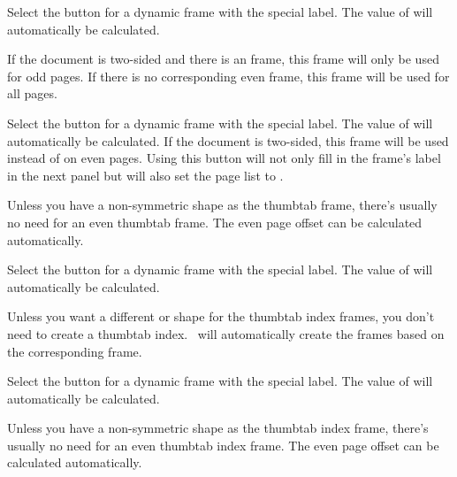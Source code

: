 Select the  button for a dynamic frame
with the special  label. The value of 
will automatically be calculated.

If the document is two-sided and there is an
 frame, this frame will only be used for
odd pages. If there is no corresponding even frame, this frame will
be used for all pages.

Select the  button for a dynamic frame
with the special  label.
The value of  will automatically be calculated.  If the
document is two-sided, this frame will be used instead of
 on even pages. Using this button will not
only fill in the frame's label in the next panel but will also set
the page list to .

\begin{information}
Unless you have a non-symmetric shape as the thumbtab frame, there's
usually no need for an even thumbtab frame. The even page offset can
be calculated automatically.
\end{information}

Select the  button for a dynamic frame
with the special 
label. The value of  will automatically be calculated.

\begin{information}
Unless you want a different  or shape for the
thumbtab index frames, you don't need to create a thumbtab index.
\FlowframTk\ will automatically create the  frames
based on the corresponding  frame.
\end{information}

Select the  button for a dynamic frame
with the special 
label. The value of  will automatically be calculated.

\begin{information}
Unless you have a non-symmetric shape as the thumbtab index frame, there's
usually no need for an even thumbtab index frame. The even page offset can
be calculated automatically.
\end{information}

